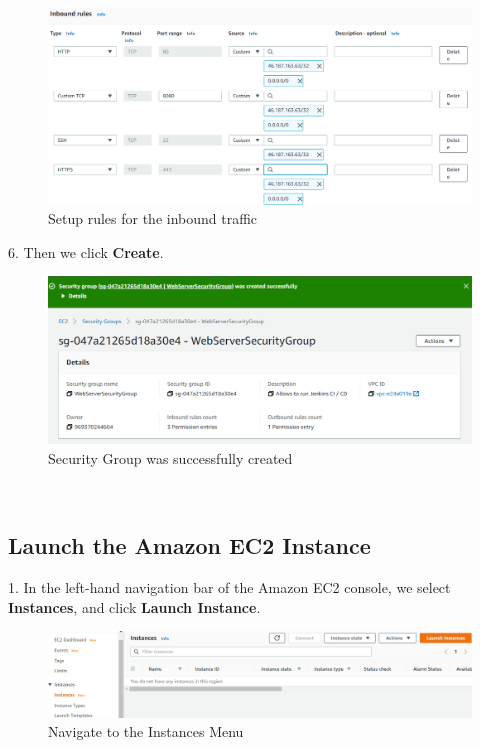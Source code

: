 \documentclass[12pt,a4paper,twoside]{article}
\begin{document}
\begin{figure}[H]
    \centering
        \includegraphics[width=15cm]{images-aws/3-inbound-rules.png}
        \caption{Setup rules for the inbound traffic}
\end{figure}


6. Then we click \textbf{Create}.


\begin{figure}[H]
    \centering
        \includegraphics[width=15cm]{images-aws/12-create-sg-created.png}
        \caption{Security Group was successfully created}
\end{figure}


~\newpage

\subsection{Launch the Amazon EC2 Instance}


1. In the left-hand navigation bar of the Amazon EC2 console, we select \textbf{Instances}, and click \textbf{Launch Instance}.


\begin{figure}[H]
    \centering
        \includegraphics[width=15cm]{images-aws/4-instances.png}
        \caption{Navigate to the Instances Menu}
\end{figure}
\end{document}
